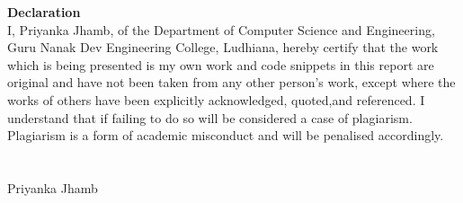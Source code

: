 {\Huge \centering \textbf{Declaration}\\}
\vspace{0.5in}
\noindent I, Priyanka Jhamb, of the Department of Computer Science and Engineering, Guru Nanak Dev Engineering College, Ludhiana, hereby certify that the work which is being presented is my own work and code snippets in this report are original and have not been taken from any other person's  work,  except  where  the  works  of  others  have  been  explicitly  acknowledged,  quoted,and  referenced.  I  understand  that  if  failing  to  do  so  will  be  considered  a  case  of  plagiarism. Plagiarism is a form of academic misconduct and will be penalised accordingly.
\\\\\\
Priyanka Jhamb
\newpage
